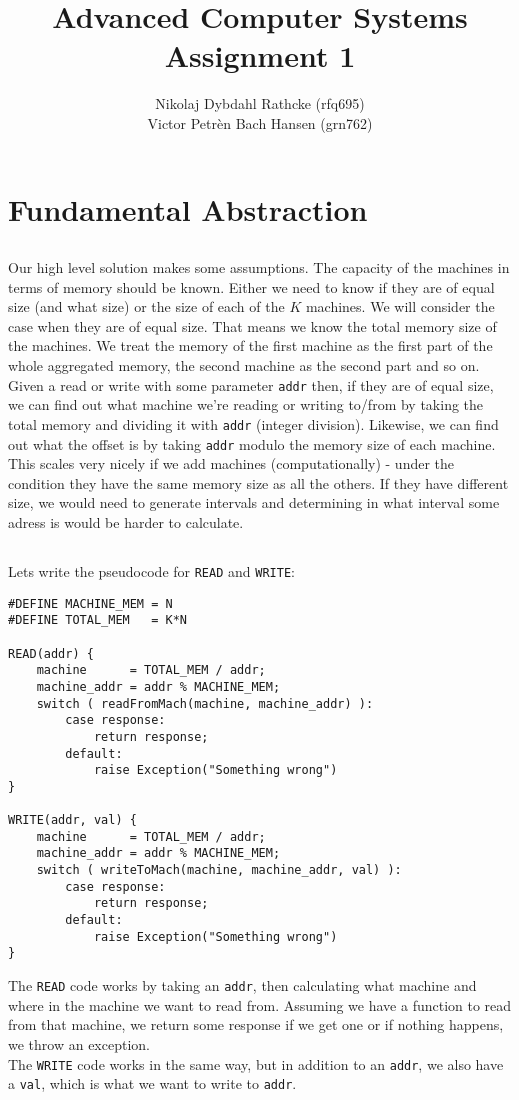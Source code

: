 \documentclass[a4paper]{article}
\author{Nikolaj Dybdahl Rathcke (rfq695) \\ Victor Petrèn Bach Hansen (grn762)}
\title{Advanced Computer Systems \\ Assignment 1}
\begin{document}
\maketitle

\section{Fundamental Abstraction}
\subsection{}
Our high level solution makes some assumptions. The capacity of the machines in terms of memory should be known. Either we need to know if they are of equal size (and what size) or the size of each of the $K$ machines. We will consider the case when they are of equal size. That means we know the total memory size of the machines. We treat the memory of the first machine as the first part of the whole aggregated memory, the second machine as the second part and so on. \\
Given a read or write with some parameter \texttt{addr} then, if they are of equal size, we can find out what machine we're reading or writing to/from by taking the total memory and dividing it with \texttt{addr} (integer division). Likewise, we can find out what the offset is by taking \texttt{addr} modulo the memory size of each machine. \\
This scales very nicely if we add machines (computationally) - under the condition they have the same memory size as all the others. If they have different size, we would need to generate intervals and determining in what interval some adress is would be harder to calculate.

\subsection{}
Lets write the pseudocode for \texttt{READ} and \texttt{WRITE}:
\begin{lstlisting}
#DEFINE MACHINE_MEM = N
#DEFINE TOTAL_MEM   = K*N

READ(addr) {
	machine      = TOTAL_MEM / addr;
	machine_addr = addr % MACHINE_MEM;
	switch ( readFromMach(machine, machine_addr) ):
		case response:
			return response;
		default:
			raise Exception("Something wrong")
}

WRITE(addr, val) {
	machine      = TOTAL_MEM / addr;
	machine_addr = addr % MACHINE_MEM;
	switch ( writeToMach(machine, machine_addr, val) ):
		case response:
			return response;
		default:
			raise Exception("Something wrong")
}
\end{lstlisting}
The \texttt{READ} code works by taking an \texttt{addr}, then calculating what machine and where in the machine we want to read from. Assuming we have a function to read from that machine, we return some response if we get one or if nothing happens, we throw an exception. \\
The \texttt{WRITE} code works in the same way, but in addition to an \texttt{addr}, we also have a \texttt{val}, which is what we want to write to \texttt{addr}.
\end{document}
